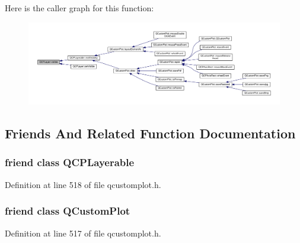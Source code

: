 Here is the caller graph for this function\+:\nopagebreak
\begin{figure}[H]
\begin{center}
\leavevmode
\includegraphics[width=350pt]{class_q_c_p_layer_a9efca636e4dcad721999a6282f296016_icgraph}
\end{center}
\end{figure}




\subsection{Friends And Related Function Documentation}
\hypertarget{class_q_c_p_layer_ad655f55cccf49ba14d5172ec517e07ae}{}
\subsubsection[{Q\+C\+P\+Layerable}]{\setlength{\rightskip}{0pt plus 5cm}friend class {\bf Q\+C\+P\+Layerable}\hspace{0.3cm}{\ttfamily [friend]}}\label{class_q_c_p_layer_ad655f55cccf49ba14d5172ec517e07ae}


Definition at line 518 of file qcustomplot.\+h.

\hypertarget{class_q_c_p_layer_a1cdf9df76adcfae45261690aa0ca2198}{}
\subsubsection[{Q\+Custom\+Plot}]{\setlength{\rightskip}{0pt plus 5cm}friend class {\bf Q\+Custom\+Plot}\hspace{0.3cm}{\ttfamily [friend]}}\label{class_q_c_p_layer_a1cdf9df76adcfae45261690aa0ca2198}


Definition at line 517 of file qcustomplot.\+h.




